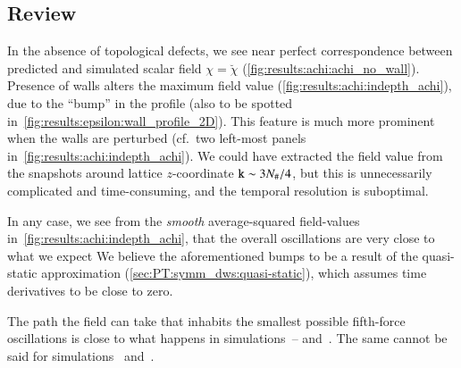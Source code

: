 


    


    

\subsection{Review} %
    In the absence of topological defects, we see near perfect correspondence between predicted and simulated scalar field $\chi=\breve{\chi}$ (\cref{fig:results:achi:achi_no_wall}). Presence of walls alters the maximum field value (\cref{fig:results:achi:indepth_achi}), due to the ``bump'' in the profile (also to be spotted in~\cref{fig:results:epsilon:wall_profile_2D}). This feature is much more prominent when the walls are perturbed (cf.~two left-most panels in~\cref{fig:results:achi:indepth_achi}). %
    We could have extracted the field value from the snapshots around lattice $z$-coordinate $\mathtt{k}\sim 3 N_\#/4$, but this is unnecessarily complicated and time-consuming, and the temporal resolution is suboptimal. 

    In any case, we see from the \emph{smooth} average-squared field-values in~\cref{fig:results:achi:indepth_achi}, that the overall oscillations are very close to what we expect
    We believe the aforementioned bumps to be a result of the quasi-static approximation (\cref{sec:PT:symm_dws:quasi-static}), which assumes time derivatives to be close to zero.

    The path the field can take that inhabits the smallest possible fifth-force oscillations is close to what happens in simulations~-- and~. The same cannot be said for simulations~ and~.
    
